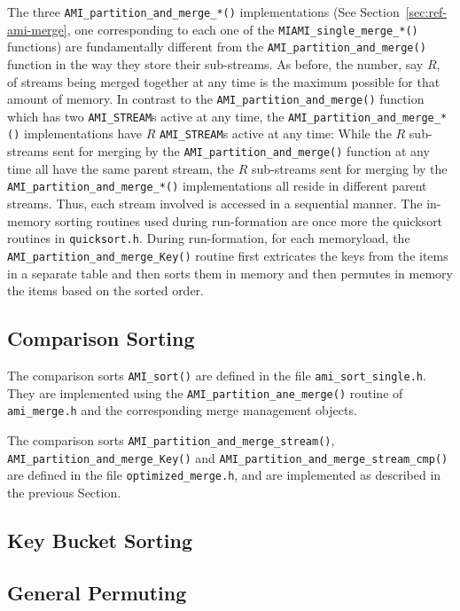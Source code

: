 The three \verb|AMI_partition_and_merge_*()| implementations (See Section~\ref{sec:ref-ami-merge}, one corresponding to each one of the \verb|MIAMI_single_merge_*()| functions) are
fundamentally  different from the \verb|AMI_partition_and_merge()| function in the way they store
their  sub-streams. As before, the number, say $R$,  of streams being merged together 
at any time is the maximum possible for that amount of memory. In contrast to the 
\verb|AMI_partition_and_merge()| function which has two \verb|AMI_STREAM|s active at
any time, the \verb|AMI_partition_and_merge_*()| implementations have $R$  \verb|AMI_STREAM|s 
active at any time: While the $R$ sub-streams
sent for merging by the \verb|AMI_partition_and_merge()| function at any time 
all have the same parent stream, the $R$ sub-streams sent for merging  by the 
 \verb|AMI_partition_and_merge_*()| implementations all reside in different
parent streams. Thus, each stream involved is accessed in a sequential manner.
The in-memory sorting routines used during run-formation are once more the 
quicksort routines in \verb|quicksort.h|. During run-formation, for each memoryload, 
the \verb|AMI_partition_and_merge_Key()| routine 
first extricates the keys from the items in a separate table and then sorts them 
in memory and then permutes in memory the items based on the sorted order.
\subsection{Comparison Sorting}
\label{sec:ref-imp-ami-sort}
The comparison sorts \verb|AMI_sort()| are defined in the file \verb|ami_sort_single.h|.
They are implemented using the \verb|AMI_partition_ane_merge()| routine of 
\verb|ami_merge.h| and the corresponding merge management objects.

The comparison sorts \verb|AMI_partition_and_merge_stream()|, \verb|AMI_partition_and_merge_Key()| and  \verb|AMI_partition_and_merge_stream_cmp()| are defined in the file
\verb|optimized_merge.h|, and are implemented as described in the previous 
Section.
\subsection{Key Bucket Sorting}
\label{sec:ref-imp-ami-kb-sort}


\subsection{General Permuting}
\label{sec:ref-imp-ami-gp}

